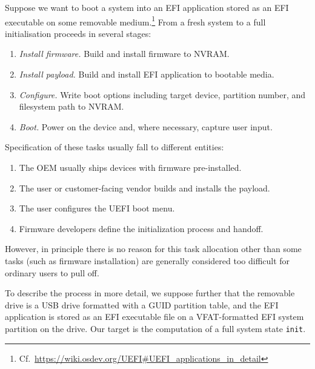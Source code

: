 Suppose we want to boot a system into an EFI application stored as an EFI executable on some removable medium.\footnote{Cf.~\url{https://wiki.osdev.org/UEFI\#UEFI\_applications\_in\_detail}}
%
From a fresh system to a full initialisation proceeds in several stages:
%
\begin{enumerate}
  \item \emph{Install firmware.} Build and install firmware to NVRAM.
  \item \emph{Install payload.} Build and install EFI application to bootable media.
  \item \emph{Configure.} Write boot options including target device, partition number, and filesystem path to NVRAM.
  \item \emph{Boot.} Power on the device and, where necessary, capture user input.
\end{enumerate}
%
Specification of these tasks usually fall to different entities:
%
\begin{enumerate}
  \item The OEM usually ships devices with firmware pre-installed.
  \item The user or customer-facing vendor builds and installs the payload.
  \item The user configures the UEFI boot menu.
  \item Firmware developers define the initialization process and handoff.
\end{enumerate}
%
However, in principle there is no reason for this task allocation other than some tasks (such as firmware installation) are generally considered too difficult for ordinary users to pull off.

To describe the process in more detail, we suppose further that the removable drive is a USB drive formatted with a GUID partition table, and the EFI application is stored as an EFI executable file on a VFAT-formatted EFI system partition on the drive.
%
Our target is the computation of a full system state \texttt{init}. 

